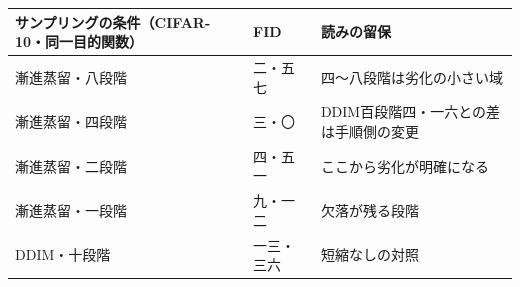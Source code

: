 \documentclass[lualatex,a4paper,10pt]{jlreq}
\begin{document}
\begin{center}
\small
\begin{tabularx}{\textwidth}{@{}p{}p{}X@{}}
\toprule
サンプリングの条件（CIFAR-10・同一目的関数） & FID & 読みの留保 \\
\midrule
漸進蒸留・八段階 & 二・五七 & 四〜八段階は劣化の小さい域 \\
漸進蒸留・四段階 & 三・〇 & DDIM百段階四・一六との差は手順側の変更 \\
漸進蒸留・二段階 & 四・五一 & ここから劣化が明確になる \\
漸進蒸留・一段階 & 九・一二 & 欠落が残る段階 \\
DDIM・十段階 & 一三・三六 & 短縮なしの対照 \\
\bottomrule
\end{tabularx}
\end{center}
\autocite{btd078}
\end{document}

